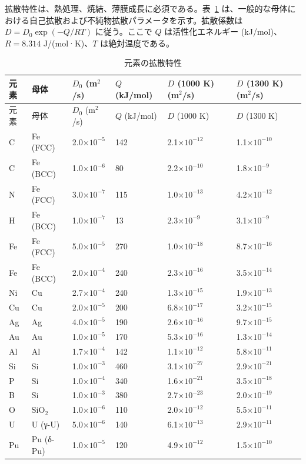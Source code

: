 \documentclass[11pt,a4paper]{article}
\theoremstyle{remark}
\begin{document}
	拡散特性は、熱処理、焼結、薄膜成長に必須である。表~\ref{tab:diffusion-properties-func} は、一般的な母体における自己拡散および不純物拡散パラメータを示す。拡散係数は \(D = D_0 \exp(-Q/RT)\) に従う。ここで \(Q\) は活性化エネルギー (kJ/mol)、\(R = 8.314\) J/(mol·K)、\(T\) は絶対温度である。
	
	\begin{longtable}{p{1.2cm}p{1.2cm}p{2.0cm}p{2.5cm}p{2.5cm}p{2.5cm}}
		\caption{元素の拡散特性} \label{tab:diffusion-properties-func} \\
		\toprule
		元素 & 母体 & \(D_0\) (m\(^2\)/s) & \(Q\) (kJ/mol) & \(D\) (1000 K) (m\(^2\)/s) & \(D\) (1300 K) (m\(^2\)/s) \\
		\midrule
		\endfirsthead
		\toprule
		元素 & 母体 & \(D_0\) (m\(^2\)/s) & \(Q\) (kJ/mol) & \(D\) (1000 K) & \(D\) (1300 K) \\
		\midrule
		\endhead
		C & Fe (FCC) & 2.0\(\times10^{-5}\) & 142 & 2.1\(\times10^{-12}\) & 1.1\(\times10^{-10}\) \\
		C & Fe (BCC) & 1.0\(\times10^{-6}\) & 80 & 2.2\(\times10^{-10}\) & 1.8\(\times10^{-9}\) \\
		N & Fe (FCC) & 3.0\(\times10^{-7}\) & 115 & 1.0\(\times10^{-13}\) & 4.2\(\times10^{-12}\) \\
		H & Fe (BCC) & 1.0\(\times10^{-7}\) & 13 & 2.3\(\times10^{-9}\) & 3.1\(\times10^{-9}\) \\
		Fe & Fe (FCC) & 5.0\(\times10^{-5}\) & 270 & 1.0\(\times10^{-18}\) & 8.7\(\times10^{-16}\) \\
		Fe & Fe (BCC) & 2.0\(\times10^{-4}\) & 240 & 2.3\(\times10^{-16}\) & 3.5\(\times10^{-14}\) \\
		Ni & Cu & 2.7\(\times10^{-4}\) & 240 & 1.3\(\times10^{-15}\) & 1.9\(\times10^{-13}\) \\
		Cu & Cu & 2.0\(\times10^{-5}\) & 200 & 6.8\(\times10^{-17}\) & 3.2\(\times10^{-15}\) \\
		Ag & Ag & 4.0\(\times10^{-5}\) & 190 & 2.6\(\times10^{-16}\) & 9.7\(\times10^{-15}\) \\
		Au & Au & 1.0\(\times10^{-5}\) & 170 & 5.3\(\times10^{-16}\) & 1.3\(\times10^{-14}\) \\
		Al & Al & 1.7\(\times10^{-4}\) & 142 & 1.1\(\times10^{-12}\) & 5.8\(\times10^{-11}\) \\
		Si & Si & 1.0\(\times10^{-3}\) & 460 & 3.1\(\times10^{-27}\) & 2.9\(\times10^{-21}\) \\
		P & Si & 1.0\(\times10^{-4}\) & 340 & 1.6\(\times10^{-21}\) & 3.5\(\times10^{-18}\) \\
		B & Si & 1.0\(\times10^{-3}\) & 380 & 2.7\(\times10^{-23}\) & 2.0\(\times10^{-19}\) \\
		O & SiO\(_2\) & 1.0\(\times10^{-6}\) & 110 & 2.0\(\times10^{-12}\) & 5.5\(\times10^{-11}\) \\
		U & U (γ-U) & 5.0\(\times10^{-6}\) & 140 & 6.1\(\times10^{-13}\) & 2.9\(\times10^{-11}\) \\
		Pu & Pu (δ-Pu) & 1.0\(\times10^{-5}\) & 120 & 4.9\(\times10^{-12}\) & 1.5\(\times10^{-10}\) \\
		\bottomrule
	\end{longtable}
\end{document}
